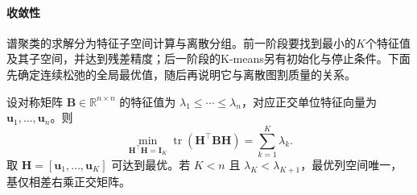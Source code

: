 \paragraph{收敛性}
谱聚类的求解分为特征子空间计算与离散分组。前一阶段要找到最小的$K$个特征值及其子空间，并达到残差精度；后一阶段的K-means另有初始化与停止条件。下面先确定连续松弛的全局最优值，随后再说明它与离散图割质量的关系。

\begin{theorem}
 \label{thm:clustering-rayleigh}
 设对称矩阵 $\bm{B}\in\mathbb{R}^{n\times n}$ 的特征值为 $\lambda_1\leq\cdots\leq\lambda_n$，对应正交单位特征向量为 $\bm{u}_1,\ldots,\bm{u}_n$。则
 \[
 \min_{\bm{H}^{\top}\bm{H}=\bm{I}_K}
 \operatorname{tr}(\bm{H}^{\top}\bm{B}\bm{H})
 =\sum_{k=1}^K\lambda_k.
 \]
 取 $\bm{H}=[\bm{u}_1,\ldots,\bm{u}_K]$ 可达到最优。若 $K<n$ 且 $\lambda_K<\lambda_{K+1}$，最优列空间唯一，基仅相差右乘正交矩阵。
\end{theorem}

